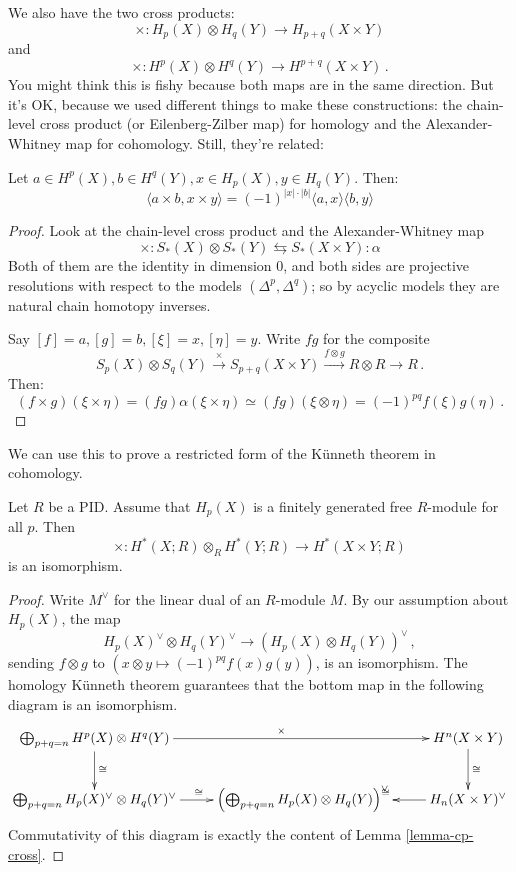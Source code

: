 We also have the two cross products:
\[
\times: H_p(X)\otimes H_q(Y)\to H_{p+q}(X\times Y)
\]
and
\[\times: H^p(X)\otimes H^q(Y)\to H^{p+q}(X\times Y)\,.
\]
You might think this is fishy because both maps are in the same direction.
But it's OK, because we used different things to make these constructions:
the chain-level cross product (or Eilenberg-Zilber map) 
for homology and the Alexander-Whitney map for
cohomology. Still, they're related:
\begin{lemma}
\label{lemma-cp-cross}
Let $a\in H^p(X),b\in H^q(Y),x\in H_p(X), y\in H_q(Y)$. Then:
\begin{equation*}
\langle a\times b,x\times y\rangle=(-1)^{|x|\cdot |b|}\langle a,x\rangle\langle b,y\rangle
\end{equation*}
\end{lemma}
\begin{proof}
Look at the chain-level cross product and the Alexander-Whitney map
\[
\times:S_*(X)\otimes S_*(Y)\leftrightarrows S_*(X\times Y):\alpha
\]
Both of them are the identity in dimension 0, 
and both sides are projective resolutions with respect to the models
$(\Delta^p,\Delta^q)$; so by acyclic models they are natural chain 
homotopy inverses. 

Say $[f]=a,[g]=b,[\xi]=x,[\eta]=y$. Write 
$fg$ for the composite 
\[
S_p(X)\otimes S_q(Y)\xrightarrow{\times}S_{p+q}(X\times Y)
\xrightarrow{f\otimes g}R\otimes R\to R\,.
\]
Then:
\[
(f\times g)(\xi\times\eta)=(fg)\alpha(\xi\times\eta)\simeq(fg)(\xi\otimes\eta) 
=(-1)^{pq}f(\xi)g(\eta)\,.
\]
\end{proof}

We can use this to prove a restricted form of the K\"unneth theorem in 
cohomology.
\begin{theorem}
\label{thm-coh-kunneth}
Let $R$ be a PID. Assume that $H_p(X)$ is a finitely generated free $R$-module
for all $p$. Then 
\[
\times:H^\ast(X;R)\otimes_RH^\ast(Y;R)\to H^\ast(X\times Y;R)
\]
is an isomorphism. 
\end{theorem}
\begin{proof}
Write $M^\vee$ for the linear dual of an $R$-module $M$. 
By our assumption about $H_p(X)$, the map
\[
H_p(X)^\vee\otimes H_q(Y)^\vee\to\left(H_p(X)\otimes H_q(Y)\right)^\vee\,,
\]
sending $f\otimes g$ to $(x\otimes y\mapsto(-1)^{pq}f(x)g(y))$,
is an isomorphism. The homology K\"unneth theorem guarantees that the 
bottom map in the following diagram is an isomorphism.
\[
\xymatrix{
\bigoplus_{p+q=n}H^p(X)\otimes H^q(Y) \ar[rr]^\times\ar[d]^\cong && 
H^n(X\times Y) \ar[d]^\cong \\
\bigoplus_{p+q=n}H_p(X)^\vee\otimes H_q(Y)^\vee \ar[r]^\cong &
\left(\bigoplus_{p+q=n}H_p(X)\otimes H_q(Y)\right)^\vee &
H_n(X\times Y)^\vee \ar[l]_\cong
}\]
Commutativity of this diagram is exactly the content of 
Lemma \ref{lemma-cp-cross}. 
\end{proof}

